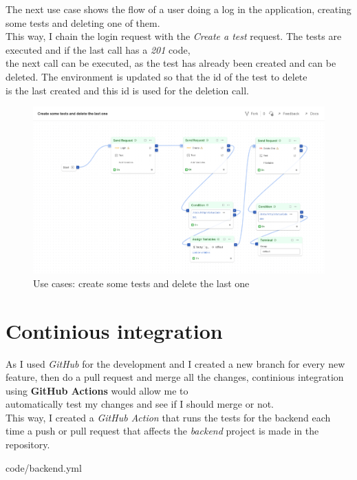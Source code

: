 The next use case shows the flow of a user doing a log in the application, creating some tests and deleting one of them. \\
This way, I chain the login request with the \textit{Create a test} request. The tests are executed and if the last call has a \textit{201} code, \\
the next call can be executed, as the test has already been created and can be deleted. The environment is updated so that the id of the test to delete \\
is the last created and this id is used for the deletion call.
\begin{figure}[H]
    \centering
        \includegraphics[angle=90, width=\textwidth, height=\textheight]{assets/postman_delete.png}
    \caption{Use cases: create some tests and delete the last one}
    \label{fig:test_createanddeleteatest}
\end{figure}

\section{Continious integration}
As I used \textit{GitHub} for the development and I created a new branch for every new feature, then do a pull request and merge all the changes, continious integration using \textbf{GitHub Actions} would allow me to \\
automatically test my changes and see if I should merge or not. \\

This way, I created a \textit{GitHub Action} that runs the tests for the backend each time a push or pull request that affects the \textit{backend} project is made in the repository.

{code/backend.yml}